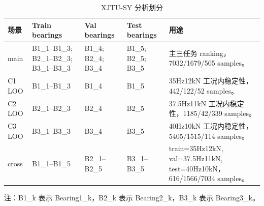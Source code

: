 \begin{table}[htbp]
\centering
\caption{XJTU-SY 分析划分}
\label{tab:xjtu_split_summary}
\scriptsize
\begin{tabularx}{\textwidth}{lYYYY}
\toprule
场景 & Train bearings & Val bearings & Test bearings & 用途 \\
\midrule
main & B1\_1--B1\_3; B2\_1--B2\_3; B3\_1--B3\_3 & B1\_4; B2\_4; B3\_4 & B1\_5; B2\_5; B3\_5 & 主三任务 ranking，7032/1679/505 samples。\\
C1 LOO & B1\_1--B1\_3 & B1\_4 & B1\_5 & 35Hz12kN 工况内稳定性，442/122/52 samples。\\
C2 LOO & B2\_1--B2\_3 & B2\_4 & B2\_5 & 37.5Hz11kN 工况内稳定性，1185/42/339 samples。\\
C3 LOO & B3\_1--B3\_3 & B3\_4 & B3\_5 & 40Hz10kN 工况内稳定性，5405/1515/114 samples。\\
cross & B1\_1--B1\_5 & B2\_1--B2\_5 & B3\_1--B3\_5 & train=35Hz12kN, val=37.5Hz11kN, test=40Hz10kN，616/1566/7034 samples。\\
\bottomrule
\end{tabularx}
\vspace{0.3em}
\begin{flushleft}
\scriptsize 注：B1\_k 表示 Bearing1\_k，B2\_k 表示 Bearing2\_k，B3\_k 表示 Bearing3\_k。
\end{flushleft}
\end{table}
